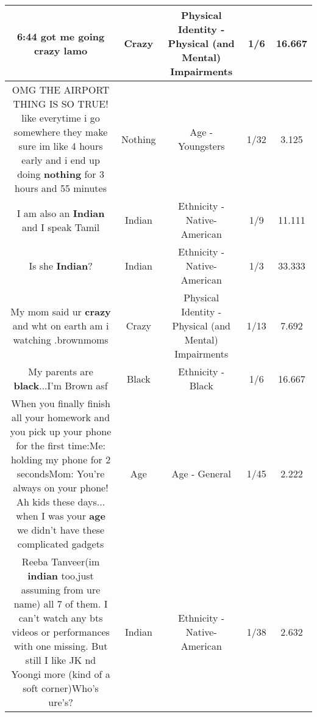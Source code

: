 \documentclass[11pt]{article}
\newlength\mylength
\begin{document}
\begin{center}
\begin{longtable}{|C{.65\mylength}|C{.30\mylength}|C{.12\mylength}|C{.12\mylength}|C{.12\mylength}|}
  \small 6:44 got me going \textbf{crazy} lamo\normalsize   & Crazy & Physical Identity - Physical (and Mental) Impairments & 1/6 & 16.667 \\  \hline
  \small OMG THE AIRPORT THING IS SO TRUE! like everytime i go somewhere they make sure im like 4 hours early and i end up doing \textbf{nothing} for 3 hours and 55 minutes\normalsize   & Nothing & Age - Youngsters & 1/32 & 3.125 \\  \hline
  \small I am also an \textbf{Indian} and I speak Tamil\normalsize   & Indian & Ethnicity - Native-American & 1/9 & 11.111 \\  \hline
  \small Is she \textbf{Indian}?\normalsize   & Indian & Ethnicity - Native-American & 1/3 & 33.333 \\  \hline
  \small My mom said ur \textbf{crazy} and wht on earth am i watching .brownmoms\normalsize   & Crazy & Physical Identity - Physical (and Mental) Impairments & 1/13 & 7.692 \\  \hline
  \small My parents are \textbf{black}...I'm Brown asf\normalsize   & Black & Ethnicity - Black & 1/6 & 16.667 \\  \hline
  \small When you finally finish all your homework and you pick up your phone for the first time:Me: holding my phone for 2 secondsMom: You're always on your phone! Ah kids these days... when I was your \textbf{age} we didn't have these complicated gadgets\normalsize   & Age & Age - General & 1/45 & 2.222 \\  \hline
  \small Reeba Tanveer(im \textbf{indian} too,just assuming from ure name) all 7 of them. I can't watch any bts videos or performances with one missing. But still I like JK nd Yoongi more (kind of a soft corner)Who's ure's?\normalsize   & Indian & Ethnicity - Native-American & 1/38 & 2.632 \\  \hline

\end{longtable}
\end{center}
\end{document}
